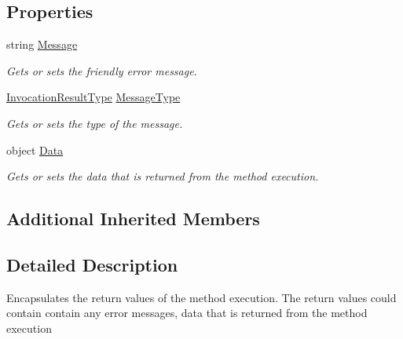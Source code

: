 \subsection*{Properties}
\begin{DoxyCompactItemize}
\item 
string \hyperlink{class_stand_alone_framework_1_1_framework_classes_1_1_invocation_result_a901421598cda8841d37a774865e7d037}{Message}
\begin{DoxyCompactList}\small\item\em Gets or sets the friendly error message. \end{DoxyCompactList}\item 
\hyperlink{class_stand_alone_framework_1_1_framework_classes_1_1_invocation_result_a536bbf61143c8a5b8364bf7c77896ba4}{Invocation\+Result\+Type} \hyperlink{class_stand_alone_framework_1_1_framework_classes_1_1_invocation_result_a581f41c7d799d0ea4eb63660cc901b7c}{Message\+Type}
\begin{DoxyCompactList}\small\item\em Gets or sets the type of the message. \end{DoxyCompactList}\item 
object \hyperlink{class_stand_alone_framework_1_1_framework_classes_1_1_invocation_result_a3cd591d332da9a4149dfa2444cec747e}{Data}
\begin{DoxyCompactList}\small\item\em Gets or sets the data that is returned from the method execution. \end{DoxyCompactList}\end{DoxyCompactItemize}
\subsection*{Additional Inherited Members}


\subsection{Detailed Description}
Encapsulates the return values of the method execution. The return values could contain contain any error messages, data that is returned from the method execution 



